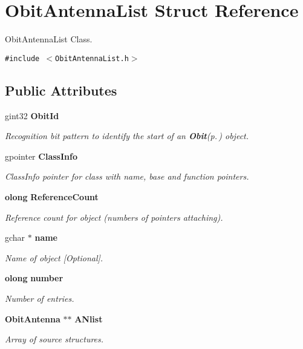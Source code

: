 \section{Obit\-Antenna\-List Struct Reference}
\label{structObitAntennaList}
Obit\-Antenna\-List Class.  


{\tt \#include $<$Obit\-Antenna\-List.h$>$}

\subsection*{Public Attributes}
\begin{CompactItemize}
\item 
gint32 {\bf Obit\-Id}
\begin{CompactList}\small\item\em Recognition bit pattern to identify the start of an {\bf Obit}{\rm (p.\,\pageref{structObit})} object. \item\end{CompactList}\item 
gpointer {\bf Class\-Info}
\begin{CompactList}\small\item\em Class\-Info pointer for class with name, base and function pointers. \item\end{CompactList}\item 
{\bf olong} {\bf Reference\-Count}
\begin{CompactList}\small\item\em Reference count for object (numbers of pointers attaching). \item\end{CompactList}\item 
gchar $\ast$ {\bf name}
\begin{CompactList}\small\item\em Name of object [Optional]. \item\end{CompactList}\item 
{\bf olong} {\bf number}
\begin{CompactList}\small\item\em Number of entries. \item\end{CompactList}\item 
{\bf Obit\-Antenna} $\ast$$\ast$ {\bf ANlist}
\begin{CompactList}\small\item\em Array of source structures. \item\end{CompactList}\item 
$$
\end{CompactItemize}
